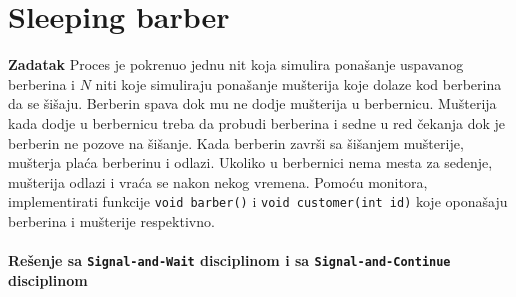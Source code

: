 \clearpage
\section{Sleeping barber}
\textbf{\large Zadatak} Proces je pokrenuo jednu nit koja simulira pona\v{s}anje uspavanog berberina i $N$ niti koje simuliraju pona\v{s}anje mu\v{s}terija koje dolaze kod berberina da se \v{s}i\v{s}aju. Berberin spava dok mu ne dodje mu\v{s}terija u berbernicu. Mu\v{s}terija kada dodje u berbernicu treba da probudi berberina i sedne u red \v{c}ekanja dok je berberin ne pozove na \v{s}i\v{s}anje. Kada berberin zavr\v{s}i sa \v{s}i\v{s}anjem mu\v{s}terije, mu\v{s}terja pla\'{c}a berberinu i odlazi. Ukoliko u berbernici nema mesta za sedenje, mu\v{s}terija odlazi i vra\'{c}a se nakon nekog vremena. Pomo\'{c}u monitora, implementirati funkcije \texttt{void barber()} i \texttt{void customer(int id)} koje opona\v{s}aju berberina i mu\v{s}terije respektivno.
\\\\
\textbf{Re\v{s}enje sa \texttt{Signal-and-Wait} disciplinom i sa \texttt{Signal-and-Continue} disciplinom}
